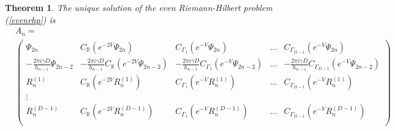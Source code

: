 \documentclass[12pt]{article}
\newtheorem{theorem}{Theorem}[section]
\theoremstyle{definition}
\begin{document}
\begin{theorem}
The unique solution of the \textit{even} Riemann-Hilbert problem (\ref{evenrhp}) is 
\begin{equation}\label{EvenSolution}
\begin{split}
&A_{n} = \\
&\left(\begin{matrix}
\Psi_{2n} & C_\mathbb{R}(e^{-2V}\Psi_{2n}) & C_{\Gamma_1}(e^{-V}\Psi_{2n}) & \dots & C_{\Gamma_{D-1}}(e^{-V}\Psi_{2n}) \\
- \frac{2\pi i \gamma D}{h_{n-1}}\Psi_{2n-2} & - \frac{2\pi i \gamma D}{h_{n-1}} C_\mathbb{R}(e^{-2V}\Psi_{2n-2}) & - \frac{2\pi i \gamma D}{h_{n-1}} C_{\Gamma_1}(e^{-V}\Psi_{2n-2}) & \dots & - \frac{2\pi i \gamma D}{h_{n-1}} C_{\Gamma_{D-1}}(e^{-V}\Psi_{2n-2}) \\
R^{(1)}_n & C_\mathbb{R}(e^{-2V}R^{(1)}_n) & C_{\Gamma_1}(e^{-V}R^{(1)}_n) & \dots & C_{\Gamma_{D-1}}(e^{-V}R^{(1)}_n) \\
\vdots \\
R^{(D-1)}_n & C_\mathbb{R}(e^{-2V}R^{(D-1)}_n ) & C_{\Gamma_1}(e^{-V}R^{(D-1)}_n ) & \dots & C_{\Gamma_{D-1}}(e^{-V}R^{(D-1)}_n ) \\
\end{matrix}\right)
\end{split}
\end{equation}
\end{theorem}
\end{document}
